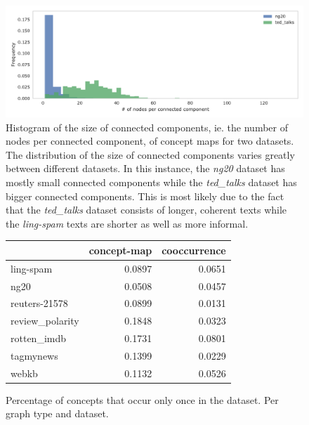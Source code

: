 \begin{figure}[htb!]
	\centering
	\includegraphics[width=0.9\linewidth]{assets/figures/connected_component_size_comparison.pdf}
	\caption{Histogram of the size of connected components, ie. the number of nodes per connected component, of concept maps for two datasets. The distribution of the size of connected components varies greatly between different datasets. In this instance, the \textit{ng20} dataset has mostly small connected components while the \textit{ted\_talks} dataset has bigger connected components. This is most likely due to the fact that the \textit{ted\_talks} dataset consists of longer, coherent texts while the \textit{ling-spam} texts are shorter as well as more informal.}
	\label{fig:histogram_connected_component_size}
\end{figure}


\begin{figure}[htb!]
	\centering
	\begin{tabular}{lrr}
		\toprule
		&  concept-map &  cooccurrence \\
		\midrule
		ling-spam       &  0.0897 &  0.0651 \\
		ng20            &  0.0508 &  0.0457 \\
		reuters-21578   &  0.0899 &  0.0131 \\
		review\_polarity &  0.1848 &  0.0323 \\
		rotten\_imdb     &  0.1731 &  0.0801 \\
		tagmynews       &  0.1399 &  0.0229 \\
		webkb           &  0.1132 &  0.0526 \\
		\bottomrule
	\end{tabular}\caption{Percentage of concepts that occur only once in the dataset. Per graph type and dataset.}
\end{figure} 


